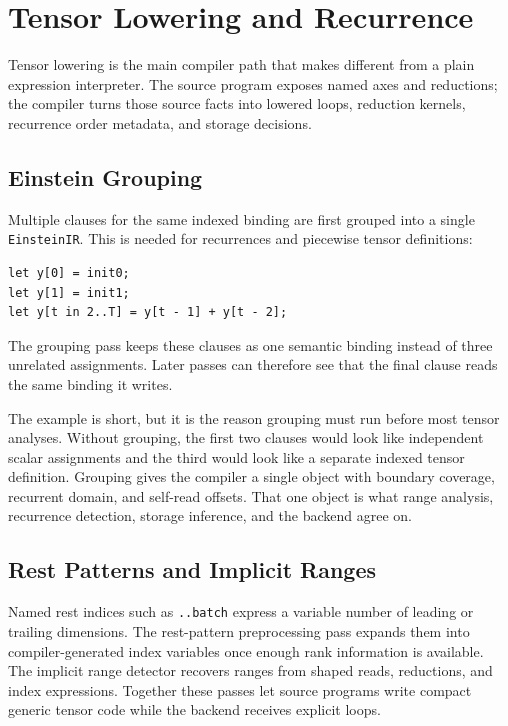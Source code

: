 \chapter{Tensor Lowering and Recurrence}

Tensor lowering is the main compiler path that makes \einlang{} different from
a plain expression interpreter. The source program exposes named axes and
reductions; the compiler turns those source facts into lowered loops, reduction
kernels, recurrence order metadata, and storage decisions.

\section{Einstein Grouping}

Multiple clauses for the same indexed binding are first grouped into a single
\texttt{EinsteinIR}. This is needed for recurrences and piecewise tensor
definitions:

\begin{lstlisting}[style=einlang]
let y[0] = init0;
let y[1] = init1;
let y[t in 2..T] = y[t - 1] + y[t - 2];
\end{lstlisting}

The grouping pass keeps these clauses as one semantic binding instead of three
unrelated assignments. Later passes can therefore see that the final clause
reads the same binding it writes.

The example is short, but it is the reason grouping must run before most tensor
analyses. Without grouping, the first two clauses would look like independent
scalar assignments and the third would look like a separate indexed tensor
definition. Grouping gives the compiler a single object with boundary coverage,
recurrent domain, and self-read offsets. That one object is what range
analysis, recurrence detection, storage inference, and the backend agree on.

\section{Rest Patterns and Implicit Ranges}

Named rest indices such as \texttt{..batch} express a variable number of leading
or trailing dimensions. The rest-pattern preprocessing pass expands them into
compiler-generated index variables once enough rank information is available.
The implicit range detector recovers ranges from shaped reads, reductions, and
index expressions. Together these passes let source programs write compact
generic tensor code while the backend receives explicit loops.


